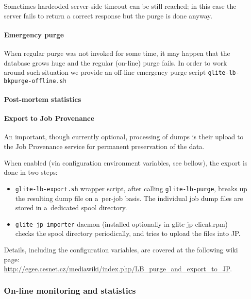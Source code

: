Sometimes hardcoded server-side timeout can be still reached; in this case the
server fails to return a correct response but the purge is done anyway. 

\paragraph{Emergency purge}

When regular purge was not invoked for some time, it may happen that 
the database grows huge and the regular (on-line) purge fails.
In order to work around such situation we provide an off-line emergency
purge script \verb'glite-lb-bkpurge-offline.sh'


\paragraph{Post-mortem statistics}


\paragraph{Export to Job Provenance}

An important, though currently optional, processing of \LB dumps
is their upload to the Job Provenance service for permanent preservation
of the data.


When enabled (via configuration environment variables, see bellow), 
the export is done in two steps:
\begin{itemize}
\item \verb'glite-lb-export.sh' wrapper script, after calling \verb'glite-lb-purge', breaks up the resulting dump file on a~per-job basis.
The individual job dump files are stored in a~dedicated spool directory.
\item \verb'glite-jp-importer' daemon (installed optionally in glite-jp-client.rpm) checks the spool directory periodically,
and tries to upload the files into JP.
\end{itemize}

Details, including the configuration variables, are covered at the following
wiki page:
\url{http://egee.cesnet.cz/mediawiki/index.php/LB_purge_and_export_to_JP}.

\subsubsection{On-line monitoring and statistics}

